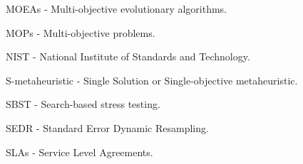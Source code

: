 
\begin{description}
 \item MOEAs - Multi-objective evolutionary algorithms. 
 \item MOPs - Multi-objective problems. 
 \item NIST -  National Institute of Standards and Technology. 
 \item S-metaheuristic - Single Solution or Single-objective metaheuristic.
 \item SBST - Search-based stress testing. 
 \item SEDR - Standard Error Dynamic Resampling.
 \item SLAs - Service Level Agreements.

 
\end{description}
